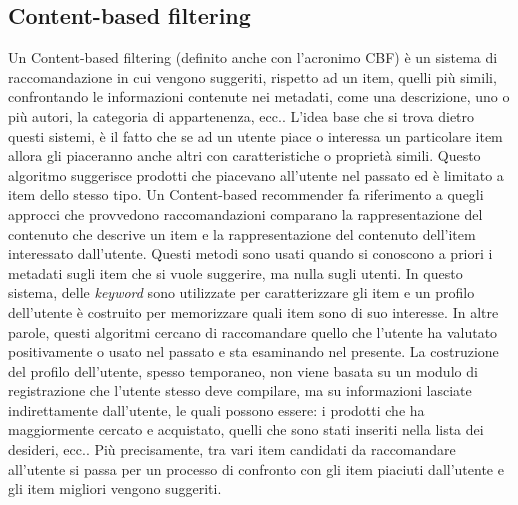 \subsection{Content-based filtering}
Un Content-based filtering (definito anche con l'acronimo CBF) è un sistema di raccomandazione in cui vengono suggeriti, rispetto ad un item, quelli 
più simili, confrontando le informazioni contenute nei metadati, come una descrizione, uno o più autori, la categoria di 
appartenenza, ecc.. L'idea base che si trova dietro questi sistemi, è il fatto che se ad un utente piace o interessa un particolare 
item allora gli piaceranno anche altri con caratteristiche o proprietà simili.\hfill\break
Questo algoritmo suggerisce prodotti che piacevano all'utente nel passato ed è limitato a item dello stesso tipo. Un 
Content-based recommender fa riferimento a quegli approcci che provvedono raccomandazioni comparano la rappresentazione del 
contenuto che descrive un item e la rappresentazione del contenuto dell'item interessato dall'utente.\hfill\break
Questi metodi sono usati quando si conoscono a priori i metadati sugli item che si vuole suggerire, ma nulla sugli utenti.
In questo sistema, delle \textit{keyword} sono utilizzate per caratterizzare gli item e un profilo dell'utente è 
costruito per memorizzare quali item sono di suo interesse. In altre parole, questi algoritmi cercano di raccomandare quello che 
l'utente ha valutato positivamente o usato nel passato e sta esaminando nel presente. La costruzione del profilo dell'utente, 
spesso temporaneo, non viene basata su un modulo di registrazione che l'utente stesso deve compilare, ma su informazioni 
lasciate indirettamente dall'utente, le quali possono essere: i prodotti che ha maggiormente cercato e acquistato, quelli che sono 
stati inseriti nella lista dei desideri, ecc.. Più precisamente, tra vari item candidati da raccomandare all'utente si passa per un 
processo di confronto con gli item piaciuti dall'utente e gli item migliori vengono suggeriti.
%
